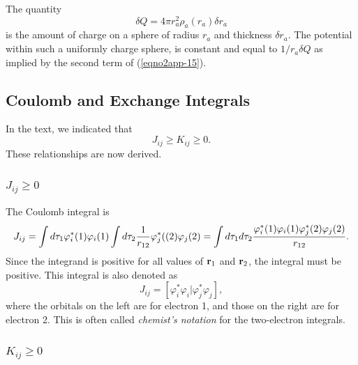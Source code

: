 The quantity
\begin{equation}
\delta Q = 4 \pi r^2_a \rho_a ( r_a ) \delta r_a
\end{equation}
is the amount of charge on a sphere of radius $r_a$ and thickness 
$\delta r_a$.  The potential within such a uniformly charge sphere, is 
constant and equal to $1/r_a \delta Q$ as implied by the second
term of (\ref{eqno2app-15}).

\subsection{Coulomb and Exchange Integrals}
\label{appendix-b}

In the text, we indicated that
\begin{equation}
J_{ij} \geq K_{ij} \geq 0 .
\end{equation}
These relationships are now derived.

\subsubsection{$J_{ij}\geq 0$}

The Coulomb integral is
\begin{equation}
J_{ij} = \int d \tau_1 \varphi^*_i (1) \varphi_i(1) \int d \tau_2 {1 \over 
r_{12}} \varphi^*_j ((2) \varphi_j(2) = \int d \tau_1 d \tau_2 
{\varphi^*_i(1)\varphi_i(1)\varphi^*_j(2)\varphi_j(2) \over r_{12}} .
\end{equation}
Since the integrand is positive for all values of ${\bf r}_1$ and 
${\bf r}_2$, the integral must be positive. This integral is also denoted as
\begin{equation}
J_{ij} = \left[ \varphi^*_i \varphi_i \vert \varphi^*_j \varphi_j \right] ,
\end{equation}
where the orbitals on the left are for electron 1, and those on the 
right are for electron 2. This is often called \emph{chemist's
notation} for the two-electron integrals.

\subsubsection{$K_{ij} \geq 0$}

